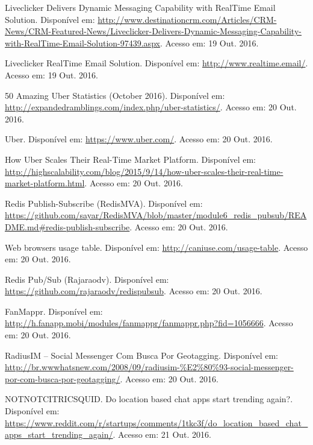 \documentclass[brazil,ruledheader]{abntifes}
\begin{document}
	\begin{thebibliography}{9}
		Liveclicker Delivers Dynamic Messaging Capability with RealTime Email Solution. Disponível em: \url{http://www.destinationcrm.com/Articles/CRM-News/CRM-Featured-News/Liveclicker-Delivers-Dynamic-Messaging-Capability-with-RealTime-Email-Solution-97439.aspx}.
		Acesso em: 19 Out. 2016.
		
		Liveclicker RealTime Email Solution. Disponível em: \url{http://www.realtime.email/}.
		Acesso em: 19 Out. 2016.
		
		50 Amazing Uber Statistics (October 2016). Disponível em: \url{http://expandedramblings.com/index.php/uber-statistics/}.
		Acesso em: 20 Out. 2016.
		
		Uber. Disponível em: \url{https://www.uber.com/}.
		Acesso em: 20 Out. 2016.
		
		How Uber Scales Their Real-Time Market Platform. Disponível em: \url{http://highscalability.com/blog/2015/9/14/how-uber-scales-their-real-time-market-platform.html}.
		Acesso em: 20 Out. 2016.
		
		Redis Publish-Subscribe (RedisMVA). Disponível em: \url{https://github.com/sayar/RedisMVA/blob/master/module6_redis_pubsub/README.md#redis-publish-subscribe}.
		Acesso em: 20 Out. 2016.
		
		Web browsers usage table. Disponível em: \url{http://caniuse.com/usage-table}.
		Acesso em: 20 Out. 2016.
		
		Redis Pub/Sub (Rajaraodv). Disponível em: \url{https://github.com/rajaraodv/redispubsub}.
		Acesso em: 20 Out. 2016.
		
		FanMappr. Disponível em: \url{http://h.fanapp.mobi/modules/fanmappr/fanmappr.php?fid=1056666}.
		Acesso em: 20 Out. 2016.
		
		RadiusIM – Social Messenger Com Busca Por Geotagging. Disponível em: \url{http://br.wwwhatsnew.com/2008/09/radiusim-%E2%80%93-social-messenger-por-com-busca-por-geotagging/}.
			Acesso em: 20 Out. 2016.
			
		NOTNOTCITRICSQUID. Do location based chat apps start trending again?. Disponível em: \url{https://www.reddit.com/r/startups/comments/1tkc3f/do_location_based_chat_apps_start_trending_again/}.
		Acesso em: 21 Out. 2016.
		

\end{thebibliography}
\end{document}
